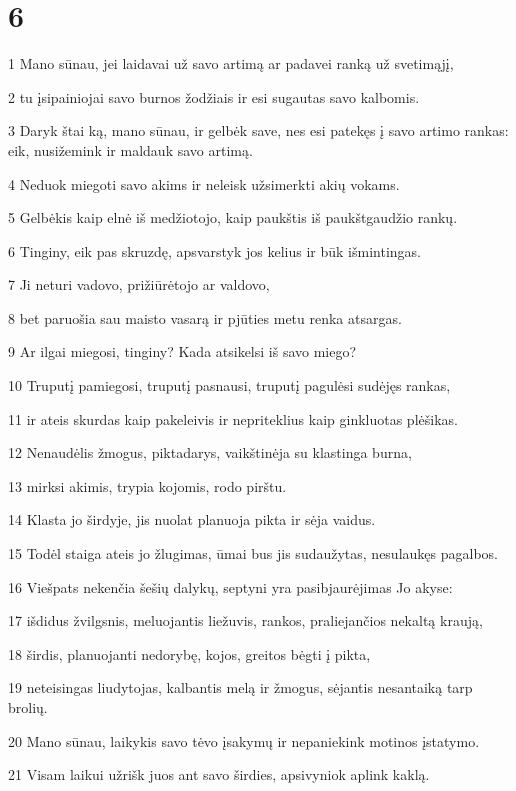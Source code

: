 \chapter{6}


\par 1 Mano sūnau, jei laidavai už savo artimą ar padavei ranką už svetimąjį, 
\par 2 tu įsipainiojai savo burnos žodžiais ir esi sugautas savo kalbomis. 
\par 3 Daryk štai ką, mano sūnau, ir gelbėk save, nes esi patekęs į savo artimo rankas: eik, nusižemink ir maldauk savo artimą. 
\par 4 Neduok miegoti savo akims ir neleisk užsimerkti akių vokams. 
\par 5 Gelbėkis kaip elnė iš medžiotojo, kaip paukštis iš paukštgaudžio rankų. 
\par 6 Tinginy, eik pas skruzdę, apsvarstyk jos kelius ir būk išmintingas. 
\par 7 Ji neturi vadovo, prižiūrėtojo ar valdovo, 
\par 8 bet paruošia sau maisto vasarą ir pjūties metu renka atsargas. 
\par 9 Ar ilgai miegosi, tinginy? Kada atsikelsi iš savo miego? 
\par 10 Truputį pamiegosi, truputį pasnausi, truputį pagulėsi sudėjęs rankas, 
\par 11 ir ateis skurdas kaip pakeleivis ir nepriteklius kaip ginkluotas plėšikas. 
\par 12 Nenaudėlis žmogus, piktadarys, vaikštinėja su klastinga burna, 
\par 13 mirksi akimis, trypia kojomis, rodo pirštu. 
\par 14 Klasta jo širdyje, jis nuolat planuoja pikta ir sėja vaidus. 
\par 15 Todėl staiga ateis jo žlugimas, ūmai bus jis sudaužytas, nesulaukęs pagalbos. 
\par 16 Viešpats nekenčia šešių dalykų, septyni yra pasibjaurėjimas Jo akyse: 
\par 17 išdidus žvilgsnis, meluojantis liežuvis, rankos, praliejančios nekaltą kraują, 
\par 18 širdis, planuojanti nedorybę, kojos, greitos bėgti į pikta, 
\par 19 neteisingas liudytojas, kalbantis melą ir žmogus, sėjantis nesantaiką tarp brolių. 
\par 20 Mano sūnau, laikykis savo tėvo įsakymų ir nepaniekink motinos įstatymo. 
\par 21 Visam laikui užrišk juos ant savo širdies, apsivyniok aplink kaklą. 
